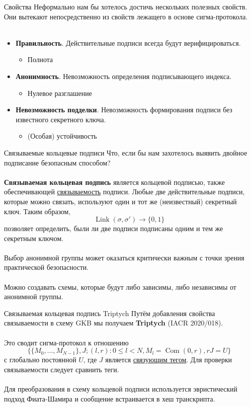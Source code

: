 \documentclass[aspectratio=169]{beamer}
\newcommand{\com}{\operatorname{Com}}
\begin{document}
\begin{frame}{Свойства}
Неформально нам бы хотелось достичь нескольких полезных свойств. Они вытекают непосредственно из свойств лежащего в основе сигма-протокола.
\\~\\
\begin{itemize}
\item \textbf{Правильность}. Действительные подписи всегда будут верифицироваться.
\begin{itemize}
\item Полнота
\end{itemize}
\item \textbf{Анонимность}. Невозможность определения подписывающего индекса.
\begin{itemize}
\item Нулевое разглашение
\end{itemize}
\item \textbf{Невозможность подделки}. Невозможность формирования подписи без известного секретного ключа.
\begin{itemize}
\item (Особая) устойчивость
\end{itemize}
\end{itemize}
\end{frame}


\begin{frame}{Связываемые кольцевые подписи}
Что, если бы нам захотелось выявить двойное подписание безопасным способом?
\\~\\
\textbf{Связываемая кольцевая подпись} является кольцевой подписью, также обеспечивающей \underline{связываемость} подписи. Любые две действительные подписи, которые можно связать, используют один и тот же (неизвестный) секретный ключ. Таким образом,
$$\operatorname{Link}(\sigma,\sigma') \to \{0,1\}$$
позволяет определить, были ли две подписи подписаны одним и тем же секретным ключом.
\\~\\
Выбор анонимной группы может оказаться критически важным с точки зрения практической безопасности.
\\~\\
Можно создавать схемы, которые будут либо зависимы, либо независимы от анонимной группы.
\end{frame}


\begin{frame}{Связываемая кольцевая подпись Triptych}
Путём добавления свойства связываемости в схему GKB мы получаем \textbf{Triptych} (IACR 2020/018).
\\~\\
Это сводит сигма-протокол к отношению
$$\Big\{\{M_0,\ldots,M_{N-1}\}, J;(l,r) : 0 \leq l < N, M_l = \com(0,r), rJ = U\Big\}$$
с глобально постоянной $U$, где $J$ является \underline{связующим тегом}. Для проверки связываемости следует сравнить теги.
\\~\\
Для преобразования в схему кольцевой подписи используется эвристический подход Фиата-Шамира и сообщение встраивается в хеш транскрипта.
\end{frame}
\end{document}
